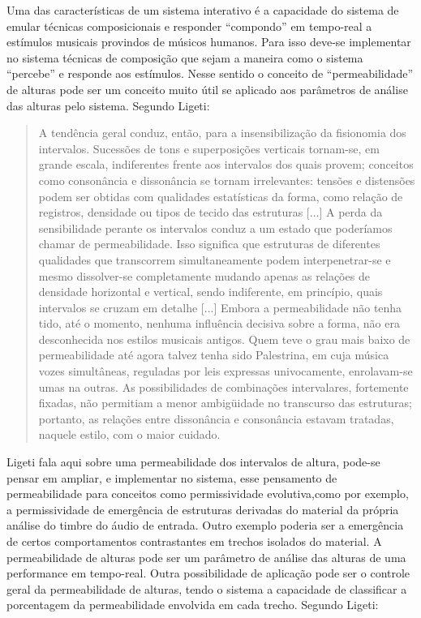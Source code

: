 \documentclass[draft]{ppgmus}
\begin{document}
Uma das características de um sistema interativo é a capacidade do sistema
de emular técnicas composicionais e responder ``compondo'' em tempo-real a
estímulos musicais provindos de músicos humanos. Para isso deve-se implementar
no sistema técnicas de composição que sejam a maneira como o sistema ``percebe''
e responde aos estímulos. Nesse sentido o conceito de “permeabilidade” de 
alturas \cite{ligeti58:transformacoes} pode ser um conceito muito útil se aplicado aos parâmetros
de análise das alturas pelo sistema. Segundo Ligeti:

\begin{quote}
  A tendência geral conduz, então, para a insensibilização da
  fisionomia dos intervalos. Sucessões de tons e superposições
  verticais tornam-se, em grande escala, indiferentes frente aos
  intervalos dos quais provem; conceitos como consonância e
  dissonância se tornam irrelevantes: tensões e distensões podem ser
  obtidas com qualidades estatísticas da forma, como relação de
  registros, densidade ou tipos de tecido das estruturas [...] A perda
  da sensibilidade perante os intervalos conduz a um estado que
  poderíamos chamar de permeabilidade. Isso significa que estruturas
  de diferentes qualidades que transcorrem simultaneamente podem
  interpenetrar-se e mesmo dissolver-se completamente mudando apenas
  as relações de densidade horizontal e vertical, sendo indiferente,
  em princípio, quais intervalos se cruzam em detalhe [...] Embora a
  permeabilidade não tenha tido, até o momento, nenhuma influência
  decisiva sobre a forma, não era desconhecida nos estilos musicais
  antigos. Quem teve o grau mais baixo de permeabilidade até agora
  talvez tenha sido Palestrina, em cuja música vozes simultâneas,
  reguladas por leis expressas univocamente, enrolavam-se umas na
  outras. As possibilidades de combinações intervalares, fortemente
  fixadas, não permitiam a menor ambigüidade no transcurso das
  estruturas; portanto, as relações entre dissonância e consonância
  estavam tratadas, naquele estilo, com o maior cuidado.
\end{quote}
 
Ligeti fala aqui sobre uma permeabilidade dos intervalos de altura,
pode-se pensar em ampliar, e implementar no sistema, esse pensamento
de permeabilidade para conceitos como permissividade evolutiva,como por
exemplo, a permissividade de emergência de estruturas derivadas do material 
da própria análise do timbre do áudio de entrada. Outro exemplo poderia ser a 
emergência de certos comportamentos contrastantes em trechos isolados do material.
A permeabilidade de alturas pode ser um parâmetro de análise das alturas 
de uma performance em tempo-real. Outra possibilidade de aplicação pode ser o
controle geral da permeabilidade de alturas, tendo o sistema a capacidade de
classificar a porcentagem da permeabilidade envolvida em cada trecho. Segundo
Ligeti: 
\end{document}
